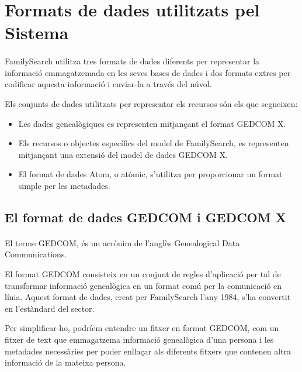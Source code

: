 \section{Formats de dades utilitzats pel Sistema}

    \paragraph{}
    FamilySearch utilitza tres formats de dades diferents per representar la informació emmagatzemada en les seves bases de dades i dos formats extres per codificar aquesta informació i enviar-la a través del núvol.

    Els conjunts de dades utilitzats per representar els recursos són els que segueixen:

    \begin{itemize}
        \item Les dades genealògiques es representen mitjançant el format GEDCOM X.
        \item Els recursos o objectes específics del model de FamilySearch, es representen mitjançant una extensió del model de dades GEDCOM X.
        \item El format de dades Atom, o atòmic, s’utilitza per proporcionar un format simple per les metadades.
    \end{itemize}


    \subsection{El format de dades GEDCOM i GEDCOM X}

        \paragraph{}
        El terme \gls{GEDCOM}, és un acrònim de l'anglès Genealogical Data Communications.

        El format GEDCOM consisteix en un conjunt de regles d'aplicació per tal de transformar informació genealògica en un format comú per la comunicació en línia. Aquest format de dades, creat per FamilySearch l'any 1984, s'ha convertit en l'estàndard del sector.

        Per simplificar-ho, podríem entendre un fitxer en format GEDCOM, com un fitxer de text que emmagatzema informació genealògica d’una persona i les metadades necessàries per poder enllaçar als diferents fitxers que contenen altra informació de la mateixa persona.

